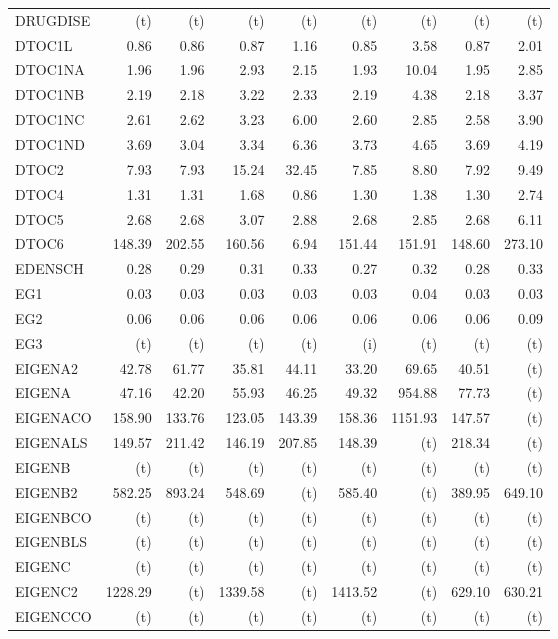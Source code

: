 \documentclass[11pt,twoside]{article}
\begin{document}
{\begin{longtable}[c]{|l|r|r|r|r|r|r|r|r|}
DRUGDISE & (t) & (t) & (t) & (t) & (t) & (t) & (t) & (t) \\
DTOC1L & 0.86 & 0.86 & 0.87 & 1.16 & 0.85 & 3.58 & 0.87 & 2.01 \\
DTOC1NA & 1.96 & 1.96 & 2.93 & 2.15 & 1.93 & 10.04 & 1.95 & 2.85 \\
DTOC1NB & 2.19 & 2.18 & 3.22 & 2.33 & 2.19 & 4.38 & 2.18 & 3.37 \\
DTOC1NC & 2.61 & 2.62 & 3.23 & 6.00 & 2.60 & 2.85 & 2.58 & 3.90 \\
DTOC1ND & 3.69 & 3.04 & 3.34 & 6.36 & 3.73 & 4.65 & 3.69 & 4.19 \\
DTOC2 & 7.93 & 7.93 & 15.24 & 32.45 & 7.85 & 8.80 & 7.92 & 9.49 \\
DTOC4 & 1.31 & 1.31 & 1.68 & 0.86 & 1.30 & 1.38 & 1.30 & 2.74 \\
DTOC5 & 2.68 & 2.68 & 3.07 & 2.88 & 2.68 & 2.85 & 2.68 & 6.11 \\
DTOC6 & 148.39 & 202.55 & 160.56 & 6.94 & 151.44 & 151.91 & 148.60 & 273.10 \\
EDENSCH & 0.28 & 0.29 & 0.31 & 0.33 & 0.27 & 0.32 & 0.28 & 0.33 \\
EG1 & 0.03 & 0.03 & 0.03 & 0.03 & 0.03 & 0.04 & 0.03 & 0.03 \\
EG2 & 0.06 & 0.06 & 0.06 & 0.06 & 0.06 & 0.06 & 0.06 & 0.09 \\
EG3 & (t) & (t) & (t) & (t) & (i) & (t) & (t) & (t) \\
EIGENA2 & 42.78 & 61.77 & 35.81 & 44.11 & 33.20 & 69.65 & 40.51 & (t) \\
EIGENA & 47.16 & 42.20 & 55.93 & 46.25 & 49.32 & 954.88 & 77.73 & (t) \\
EIGENACO & 158.90 & 133.76 & 123.05 & 143.39 & 158.36 & 1151.93 & 147.57 & (t) \\
EIGENALS & 149.57 & 211.42 & 146.19 & 207.85 & 148.39 & (t) & 218.34 & (t) \\
EIGENB & (t) & (t) & (t) & (t) & (t) & (t) & (t) & (t) \\
EIGENB2 & 582.25 & 893.24 & 548.69 & (t) & 585.40 & (t) & 389.95 & 649.10 \\
EIGENBCO & (t) & (t) & (t) & (t) & (t) & (t) & (t) & (t) \\
EIGENBLS & (t) & (t) & (t) & (t) & (t) & (t) & (t) & (t) \\
EIGENC & (t) & (t) & (t) & (t) & (t) & (t) & (t) & (t) \\
EIGENC2 & 1228.29 & (t) & 1339.58 & (t) & 1413.52 & (t) & 629.10 & 630.21 \\
EIGENCCO & (t) & (t) & (t) & (t) & (t) & (t) & (t) & (t) \\

\end{longtable}}
\end{document}
